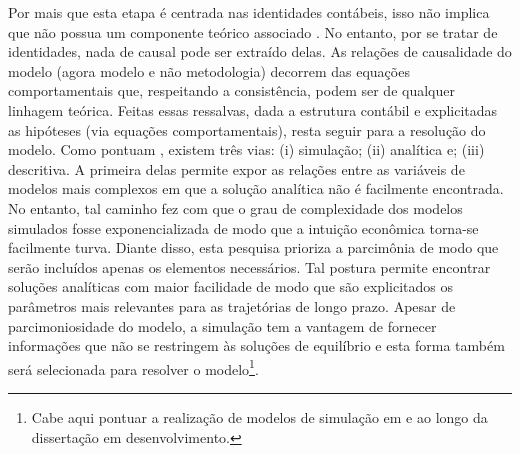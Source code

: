 Por mais que esta etapa é centrada nas identidades contábeis, isso não implica que não possua um componente teórico associado \cite[p.~15--16]{macedo_e_silva_peering_2011}.  No entanto, por se tratar de identidades, nada de causal pode ser extraído delas. As relações de causalidade do modelo (agora modelo e não metodologia) decorrem das equações comportamentais que, respeitando a consistência, podem ser de qualquer linhagem teórica. Feitas essas ressalvas, dada a estrutura contábil e explicitadas as hipóteses (via equações comportamentais), resta seguir para a resolução do modelo. Como pontuam \textcite{caverzasi_stock-flow_2013}, existem três vias: (i) simulação; (ii) analítica e; (iii) descritiva. A primeira delas permite expor as relações entre as variáveis de modelos mais complexos em que a solução analítica não é facilmente encontrada. No entanto, tal caminho fez com que o grau de complexidade dos modelos simulados fosse exponencializada de modo que a intuição econômica torna-se facilmente turva.  
Diante disso, esta pesquisa prioriza a parcimônia de modo que serão incluídos apenas os elementos necessários.
Tal postura permite encontrar soluções analíticas com maior facilidade de modo que são explicitados os parâmetros mais relevantes para as
trajetórias de longo prazo. 
Apesar de parcimoniosidade do modelo, a simulação tem a vantagem de fornecer informações que não se restringem às soluções de equilíbrio e esta forma também será selecionada para resolver o modelo\footnote{Cabe aqui pontuar a realização de modelos de simulação em \textcite{da_silveira_investimento_2019} e ao longo da dissertação em desenvolvimento.}. 

